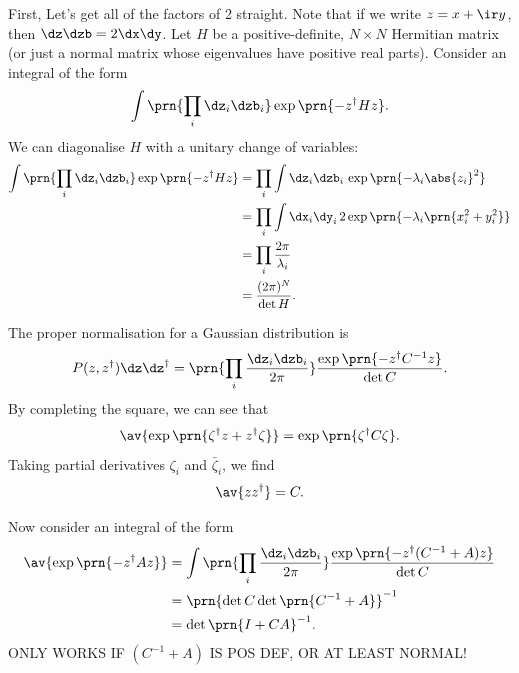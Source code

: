 \documentclass[12pt]{article}
\newcommand{\inv}{^{-1}}
\newcommand{\dg}{^\dagger}
\begin{document}
First, Let's get all of the factors of 2 straight.
Note that if we write $z=x+\ir y$, then $\dz\dzb = 2\dx\dy$.
Let $H$ be a positive-definite, $N\times N$ Hermitian matrix
(or just a normal matrix whose eigenvalues have positive real parts).
Consider an integral  of the form
%
\begin{equation*}
  \int \prn{\prod_i\dz_i\dzb_i} \exp\prn{-z\dg H z}.
\end{equation*}
%
We can diagonalise $H$ with a unitary change of variables:
%
\begin{equation}\label{eq:compgausint}
\begin{aligned}
  \int \prn{\prod_i\dz_i\dzb_i} \exp\prn{-z\dg H z} &=
    \prod_i \int \dz_i\dzb_i\, \exp\prn{-\lambda_i \abs{z_i}^2} \\
    &= \prod_i \int \dx_i\dy_i\, 2\exp\prn{-\lambda_i \prn{x_i^2+y_i^2}} \\
    &= \prod_i \frac{2\pi}{\lambda_i}\\
    &= \frac{(2\pi)^N}{\det H}.
\end{aligned}
\end{equation}
%

The proper normalisation for a Gaussian distribution is
%
\begin{equation}\label{eq:compgaussnorm}
  P(z,z\dg)\dz\dz\dg = \prn{\prod_i\frac{\dz_i\dzb_i}{2\pi}} \frac{\exp\prn{-z\dg C\inv z}}{\det C}.
\end{equation}
%
By completing the square, we can see that
%
\begin{equation}\label{eq:compgausslin}
  \av{\exp\prn{\zeta\dg z + z\dg\zeta}} = \exp\prn{\zeta\dg C\zeta}.
\end{equation}
%
Taking partial derivatives \wrt $\zeta_i$ and $\bar{\zeta}_i$, we find
%
\begin{equation}\label{eq:compgauscov}
  \av{zz\dg} = C.
\end{equation}
%

Now consider an integral of the form
%
\begin{equation}\label{eq:compgaussquad}
\begin{aligned}
  \av{\exp\prn{-z\dg A z}} &=
    \int \prn{\prod_i\frac{\dz_i\dzb_i}{2\pi}}\frac{\exp\prn{-z\dg (C\inv+A) z}}{\det C} \\
    &= \prn{\det C\det\prn{C\inv+A}}\inv \\
    &= \det\prn{I+CA}\inv.
\end{aligned}
\end{equation}
%
ONLY WORKS IF $(C\inv+A)$ IS POS DEF, OR AT LEAST NORMAL!
\end{document}
